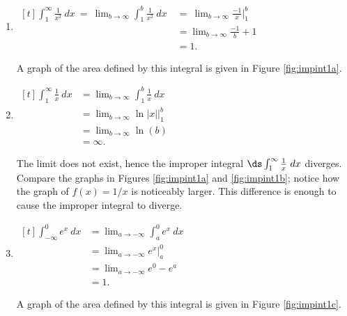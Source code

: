 {\begin{enumerate}
\item		\hfill$\begin{aligned}[t] \int_1^\infty \frac{1}{x^2}\ dx\  =\ \lim_{b\to\infty} \int_1^b\frac1{x^2}\ dx\  &=\ \lim_{b\to\infty} \frac{-1}{x}\Big|_1^b \\ 
 &= \lim_{b\to\infty} \frac{-1}{b} + 1\\
 &= 1.\end{aligned}$\hfill\null

A graph of the area defined by this integral is given in Figure \ref{fig:impint1a}.
 
 
\item		\hfill$\begin{aligned}[t]%
			\int_1^\infty \frac1x\ dx & = \lim_{b\to\infty}\int_1^b\frac1x\ dx \\
						&= \lim_{b\to\infty} \ln |x|\Big|_1^b \\
						&= \lim_{b\to\infty} \ln (b)\\
						&= \infty.
	\end{aligned}$\hfill\null
	
The limit does not exist, hence the improper integral $\ds\int_1^\infty\frac1x\ dx$ diverges. Compare the graphs in Figures \ref{fig:impint1a} and \ref{fig:impint1b}; notice how the graph of $f(x) = 1/x$ is noticeably larger. This difference is enough to cause the improper integral to diverge.


\item		\hfill$\begin{aligned}[t]%
			\int_{-\infty}^0 e^x \ dx &= \lim_{a\to-\infty} \int_a^0e^x\ dx \\
					&=  \lim_{a\to-\infty} e^x\Big|_a^0 \\
					&= \lim_{a\to-\infty} e^0-e^a \\
					&= 1.
		\end{aligned}$\hfill\null
		
		A graph of the area defined by this integral is given in Figure \ref{fig:impint1c}.
		


\end{enumerate}}

